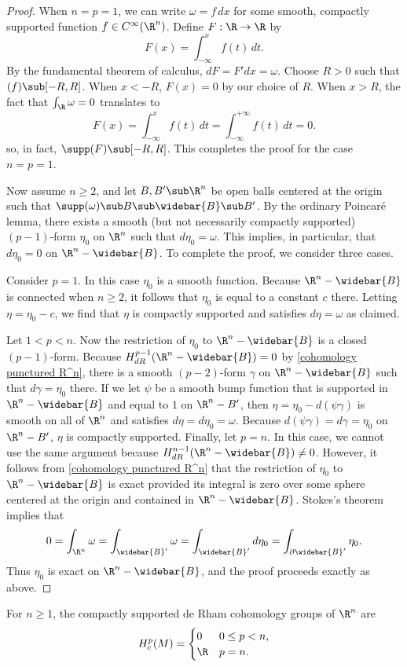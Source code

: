 \begin{proof}
When $n=p=1$, we can write $\omega=f\,dx$ for some smooth, compactly supported function $f\in C^\infty(\R^n)$. Define $F:\R\to\R$ by
\[F(x)=\int_{-\infty}^{x}f(t)\,dt.\]
By the fundamental theorem of calculus, $dF=F'dx=\omega$. Choose $R>0$ such that $(f)\sub[-R,R]$. When $x<-R$, $F(x)=0$ by our choice of $R$. When $x>R$, the fact that $\int_{\R}\omega=0$ translates to
\[F(x)=\int_{-\infty}^{x}f(t)\,dt=\int_{-\infty}^{+\infty}f(t)\,dt=0.\]
so, in fact, $\supp(F)\sub[-R,R]$. This completes the proof for the case $n=p=1$.\par
Now assume $n\geq2$, and let $B,B'\sub\R^n$ be open balls centered at the origin such that $\supp(\omega)\sub B\sub\widebar{B}\sub B'$. By the ordinary Poincar\'e lemma, there exists a smooth (but not necessarily compactly supported) $(p-1)$-form $\eta_0$ on $\R^n$ such that $d\eta_0=\omega$. This implies, in particular, that $d\eta_0=0$ on $\R^n-\widebar{B}$. To complete the proof, we consider three cases.\par
Consider $p=1$. In this case $\eta_0$ is a smooth function. Because $\R^n-\widebar{B}$ is connected when $n\geq 2$, it follows that $\eta_0$ is equal to a constant $c$ there. Letting $\eta=\eta_0-c$, we find that $\eta$ is compactly supported and satisfies $d\eta=\omega$ as claimed.\par
Let $1<p<n$. Now the restriction of $\eta_0$ to $\R^n-\widebar{B}$ is a closed $(p-1)$-form. Because $H^{p-1}_{dR}(\R^n-\widebar{B})=0$ by \cref{cohomology punctured R^n}, there is a smooth $(p-2)$-form $\gamma$ on $\R^n-\widebar{B}$ such that $d\gamma=\eta_0$ there. If we let $\psi$ be a smooth bump function that is supported in $\R^n-\widebar{B}$ and equal to $1$ on $\R^n-B'$, then $\eta=\eta_0-d(\psi\gamma)$ is smooth on all of $\R^n$ and satisfies $d\eta=d\eta_0=\omega$. Because $d(\psi\gamma)=d\gamma=\eta_0$ on $\R^n-B'$, $\eta$ is compactly supported.
Finally, let $p=n$. In this case, we cannot use the same argument because $H^{n-1}_{dR}(\R^n-\widebar{B})\neq0$. However, it follows from \cref{cohomology punctured R^n} that the restriction of $\eta_0$ to $\R^n-\widebar{B}$ is exact provided its integral is zero over some sphere centered at the origin and contained in $\R^n-\widebar{B}$. Stokes's theorem implies that
\[0=\int_{\R^n}\omega=\int_{\widebar{B}'}\omega=\int_{\widebar{B}'}d\eta_0=\int_{\partial\widebar{B}'}\eta_0.\]
Thus $\eta_0$ is exact on $\R^n-\widebar{B}$, and the proof proceeds exactly as above.
\end{proof}
\begin{theorem}
For $n\geq1$, the compactly supported de Rham cohomology groups of $\R^n$ are
\[H^p_c(M)=\begin{cases}
0&0\leq p<n,\\
\R&p=n.
\end{cases}\]
\end{theorem}
